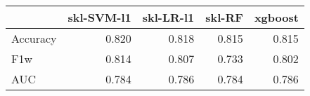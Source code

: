 \begin{tabular}{lrrrr}
\toprule
{} &  skl-SVM-l1 &  skl-LR-l1 &  skl-RF &  xgboost \\
\midrule
Accuracy &       0.820 &      0.818 &   0.815 &    0.815 \\
F1w      &       0.814 &      0.807 &   0.733 &    0.802 \\
AUC      &       0.784 &      0.786 &   0.784 &    0.786 \\
\bottomrule
\end{tabular}
